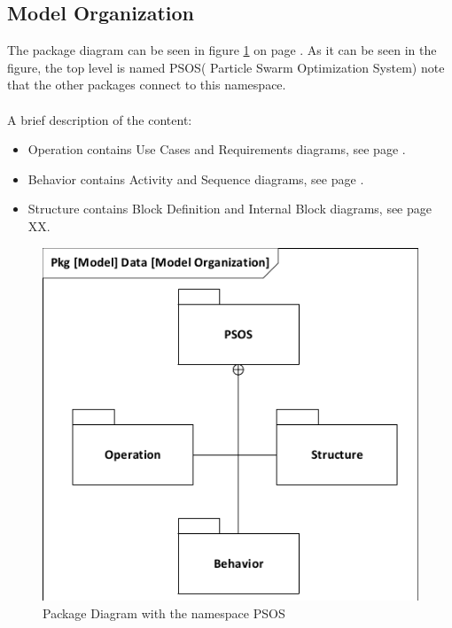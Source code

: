 \subsection{Model Organization}
The package diagram can be seen in figure \ref{fig:pkg} on page \pageref{fig:pkg}. As it can be seen in the figure, the top level is named PSOS( Particle Swarm Optimization System) note that the other packages connect to this namespace.
\\\\
A brief description of the content:
\begin{itemize}
	\item Operation contains Use Cases and Requirements diagrams, see page \pageref{sec:usecasediagrams}.
	\item Behavior contains Activity and Sequence diagrams, see page .
	\item Structure contains Block Definition and Internal Block diagrams, see page XX.
\end{itemize}

\begin{figure}[!h]
	\centering
	\includegraphics[width=0.7\linewidth]{diagram/pkg_data_model_organization.pdf}
	\caption{Package Diagram with the namespace PSOS}
	\label{fig:pkg}
\end{figure}